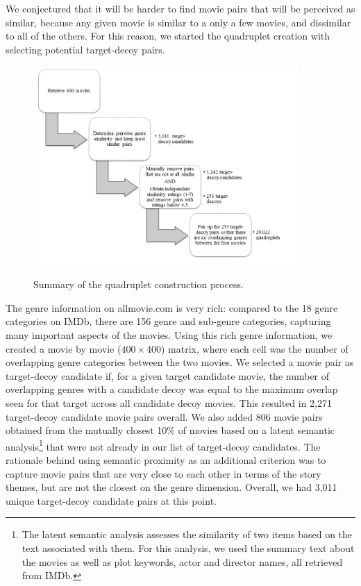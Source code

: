 \documentclass[12pt, a4paper]{article}
\begin{document}
We conjectured that it will be harder to find movie pairs that will be perceived as similar, because any given movie is similar to a only a few movies, and dissimilar to all of the others. For this reason, we started the quadruplet creation with selecting potential target-decoy pairs.

\begin{figure}[htb!]
\centering
		\caption{Summary of the quadruplet construction process. }
\includegraphics[width=0.9\textwidth]{flow.png}
\label{fig:flow}
\end{figure}

The genre information on allmovie.com is very rich: compared to the 18 genre categories on IMDb, there are 156 genre and sub-genre categories, capturing many important aspects of the movies. Using this rich genre information, we created a movie by movie ($400 \times 400$) matrix, where each cell was the number of overlapping genre categories between the two movies. We selected a movie pair as target-decoy candidate if, for a given target candidate movie, the number of overlapping genres with a candidate decoy was equal to the maximum overlap seen for that target across all candidate decoy movies. This resulted in 2,271 target-decoy candidate movie pairs overall.
We also added 806 movie pairs obtained from the mutually closest 10\% of movies based on a latent semantic analysis\footnote{The latent semantic analysis assesses the similarity of two items based on the text associated with them. For this analysis, we used the summary text about the movies as well as plot keywords, actor and director names, all retrieved from IMDb.} that were not already in our list of target-decoy candidates. The rationale behind using semantic proximity as an additional criterion was to capture movie pairs that are very close to each other in terms of the story themes, but are not the closest on the genre dimension. Overall, we had 3,011 unique target-decoy candidate pairs at this point.
\end{document}
